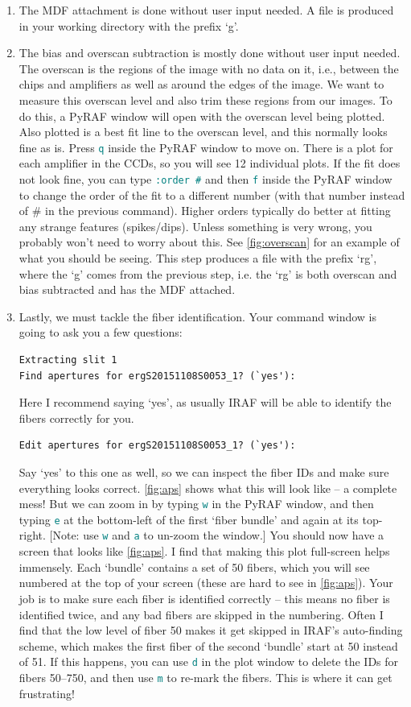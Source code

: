 \documentclass[12pt]{report}
\newcommand{\ty}[1]{\textcolor{teal}{\texttt{#1}}}
\begin{document}
\begin{enumerate}
\item The MDF attachment is done without user input needed. A file is produced in your working directory with the prefix `g'.
\item The bias and overscan subtraction is mostly done without user input needed. The overscan is the regions of the image with no data on it, i.e., between the chips and amplifiers as well as around the edges of the image. We want to measure this overscan level and also trim these regions from our images. To do this, a PyRAF window will open with the overscan level being plotted. Also plotted is a best fit line to the overscan level, and this normally looks fine as is. Press \ty{q} inside the PyRAF window to move on. There is a plot for each amplifier in the CCDs, so you will see 12 individual plots. If the fit does not look fine, you can type \ty{:order \#} and then \ty{f} inside the PyRAF window to change the order of the fit to a different number (with that number instead of \# in the previous command). Higher orders typically do better at fitting any strange features (spikes/dips). Unless something is very wrong, you probably won't need to worry about this. See \autoref{fig:overscan} for an example of what you should be seeing. This step produces a file with the prefix `rg', where the `g' comes from the previous step, i.e. the `rg' is both overscan and bias subtracted and has the MDF attached.
\item Lastly, we must tackle the fiber identification. Your command window is going to ask you a few questions:
\begin{verbatim}
Extracting slit 1
Find apertures for ergS20151108S0053_1? (`yes'): 
\end{verbatim}
Here I recommend saying `yes', as usually IRAF will be able to identify the fibers correctly for you. 
\begin{verbatim}
Edit apertures for ergS20151108S0053_1? (`yes'): 
\end{verbatim}
Say `yes' to this one as well, so we can inspect the fiber IDs and make sure everything looks correct. \autoref{fig:aps} shows what this will look like -- a complete mess! But we can zoom in by typing \ty{w} in the PyRAF window, and then typing \ty{e} at the bottom-left of the first `fiber bundle' and again at its top-right. [Note: use \ty{w} and \ty{a} to un-zoom the window.] You should now have a screen that looks like \autoref{fig:aps}. I find that making this plot full-screen helps immensely. Each `bundle' contains a set of 50 fibers, which you will see numbered at the top of your screen (these are hard to see in \autoref{fig:aps}). Your job is to make sure each fiber is identified correctly -- this means no fiber is identified twice, and any bad fibers are skipped in the numbering. Often I find that the low level of fiber 50 makes it get skipped in IRAF's auto-finding scheme, which makes the first fiber of the second `bundle' start at 50 instead of 51. If this happens, you can use \ty{d} in the plot window to delete the IDs for fibers 50--750, and then use \ty{m} to re-mark the fibers. This is where it can get frustrating! \\


\end{enumerate}
\end{document}
